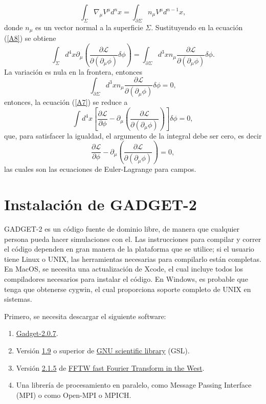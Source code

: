 \documentclass[a4paper,openright,12pt]{book}
\begin{document}
\begin{equation}
\int_{\Sigma}\nabla_{\mu}V^{\mu}d^{n}x = \int_{\partial\Sigma}n_{\mu}V^{\mu}d^{n-1}x,\label{A9}
\end{equation}
donde $n_{\mu}$ es un vector normal a la superficie $\Sigma$. Sustituyendo en la ecuación (\ref{A8}) se obtiene
\begin{equation}
\int_{\Sigma} d^{4}x\partial_{\mu}\left(\frac{\partial\mathcal{L}}{\partial(\partial_{\mu}\phi)}\delta\phi\right)
=
\int_{\partial\Sigma}d^{3}xn_{\mu}\frac{\partial\mathcal{L}}{\partial(\partial_{\mu}\phi)}\delta\phi.\label{A10}
\end{equation}
La variación es nula en la frontera, entonces
\begin{equation}
\int_{\partial\Sigma}d^{3}xn_{\mu}\frac{\partial\mathcal{L}}{\partial(\partial_{\mu}\phi)}\delta\phi = 0,\label{A11}
\end{equation}
entonces, la ecuación (\ref{A7}) se reduce a
\begin{equation}
\int d^{4}x \left[\frac{\partial\mathcal{L}}{\partial\phi} -
\partial_{\mu}\left(\frac{\partial\mathcal{L}}{\partial(\partial_{\mu}\phi)}\right)\right]\delta\phi = 0,\label{A12}
\end{equation}
que, para satisfacer la igualdad, el argumento de la integral debe ser cero, es decir 
\begin{equation}
\frac{\partial\mathcal{L}}{\partial\phi} -
\partial_{\mu}\left(\frac{\partial\mathcal{L}}{\partial(\partial_{\mu}\phi)}\right) = 0,\label{A13}
\end{equation}
las cuales son las ecuaciones de Euler-Lagrange para campos.


\chapter{Instalación de GADGET-2}\label{Apend.B}
GADGET-2 es un código fuente de dominio libre, de manera que cualquier persona pueda hacer simulaciones con el. Las instrucciones para compilar y correr el código dependen en gran manera de la plataforma que se utilice; si el usuario tiene Linux o UNIX, las herramientas necesarias para compilarlo están completas. En MacOS, se necesita una actualización de \textsf{Xcode}, el cual incluye todos los compiladores necesarios para instalar el código. En Windows, es probable que tenga que obtenerse \textsf{cygwin}, el cual proporciona soporte completo de UNIX en sistemas.

Primero, se necesita descargar el siguiente software:
\begin{enumerate}
\item \underline{Gadget-2.0.7}.
\item Versión \underline{1.9} o superior de \underline{GNU scientific library} (GSL).
\item Versión \underline{2.1.5} de \underline{FFTW fast Fourier Transform in the West}.
\item Una librería de procesamiento en paralelo, como Message Passing Interface (MPI) o como \textsf{Open-MPI} o \textsf{MPICH}.
\end{enumerate}
\end{document}
